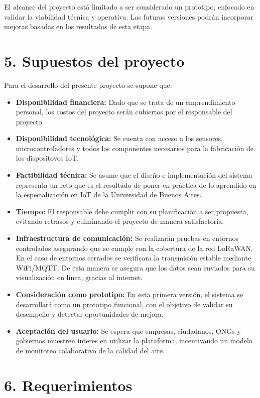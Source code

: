 \documentclass[
11pt, %
]{charter}
\begin{document}
El alcance del proyecto está limitado a ser considerado un prototipo, enfocado en validar la viabilidad técnica y operativa. Las futuras versiones podrán incorporar mejoras basadas en los resultados de esta etapa.

\section{5. Supuestos del proyecto}
\label{sec:supuestos}

Para el desarrollo del presente proyecto se supone que:

\begin{itemize}
	\item \textbf{Disponibilidad financiera:} Dado que se trata de un emprendimiento personal, los costos del proyecto serán cubiertos por el responsable del proyecto.
	\item \textbf{Disponibilidad tecnológica:} Se cuenta con acceso a los sensores, microcontroladores y todos los componentes necesarios para la fabricación de los dispositovos IoT.
	\item \textbf{Factibilidad técnica:} Se asume que el diseño e implementación del sistema representa un reto que es el resultado de poner en práctica de lo aprendido en la especialización en IoT de la Universidad de Buenos Aires.
	\item \textbf{Tiempo:} El responsable debe cumplir con su planificación a ser propuesta, evitando retrasos y culminando el proyecto de manera satisfactoria.
	\item \textbf{Infraestructura de comunicación:} Se realizarán pruebas en entornos controlados asegurando que se cumple con la cobertura de la red LoRaWAN. En el caso de entornos cerrados se verificara la transmisión estable mediante WiFi/MQTT. De esta manera se asegura que los datos sean enviados para su visualización en línea, gracias al internet.
	\item \textbf{Consideración como prototipo:} En esta primera versión, el sistema se desarrollará como un prototipo funcional, con el objetivo de validar su desempeño y detectar oportunidades de mejora.
	\item \textbf{Aceptación del usuario:} Se espera que empresas, ciudadanos, ONGs y gobiernos muestren interes en utilizar la plataforma, incentivando un modelo de monitoreo colaborativo de la calidad del aire.

\end{itemize}

\section{6. Requerimientos}
\label{sec:requerimientos}
\end{document}
